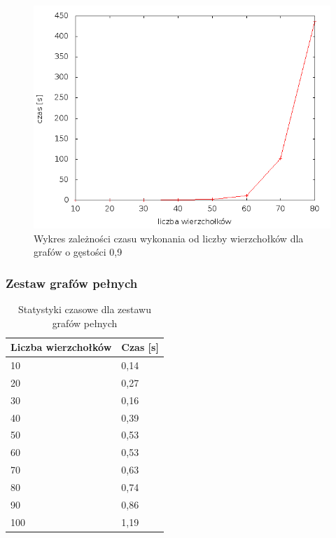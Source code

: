 \documentclass[12pt, a4paper]{article}
\begin{document}
\begin{figure}[h]
    \begin{center}
	\includegraphics[scale=0.5]{results/img/den/den_09.png}
	\caption{Wykres zależności czasu wykonania od liczby wierzchołków dla grafów o gęstości 0,9}
    \end{center}
\end{figure}

\subsubsection*{Zestaw grafów pełnych}
\begin{table}[H]
\caption{Statystyki czasowe dla zestawu grafów pełnych}
\begin{center}
    \begin{tabular}{|l|l|}
    \hline
    Liczba wierzchołków & Czas [s] \\ \hline
    10 & 0,14 \\ \hline
    20 & 0,27 \\ \hline
    30 & 0,16 \\ \hline
    40 & 0,39 \\ \hline
    50 & 0,53 \\ \hline
    60 & 0,53 \\ \hline
    70 & 0,63 \\ \hline
    80 & 0,74 \\ \hline
    90 & 0,86 \\ \hline
    100 & 1,19 \\ \hline
    \end{tabular}
\end{center}
\end{table}
\end{document}
